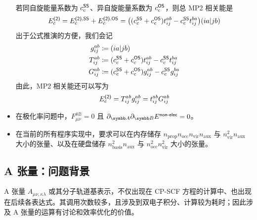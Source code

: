 \begin{itemize}[nosep]
\begin{align}
        \end{align}
        若同自旋能量系数为 $c_\mathrm{c}^{\textsf{SS}}$、异自旋能量系数为 $c_\mathrm{c}^{\textsf{OS}}$，则总 MP2 相关能是
        \begin{equation}
          E_\mathrm{c}^{\textsf{(2)}} = E_\mathrm{c}^{\textsf{(2)}, \textsf{SS}} + E_\mathrm{c}^{\textsf{(2)}, \textsf{OS}} = \big( (c_\mathrm{c}^{\textsf{SS}} + c_\mathrm{c}^{\textsf{OS}}) t_{ij}^{ab} - c_\mathrm{c}^{\textsf{SS}} t_{ij}^{ba} \big) (ia|jb)
        \end{equation}
        出于公式推演的方便，我们会记
        \begin{align}
            \label{eq.3.def.g-ijab}
            g_{ij}^{ab} &\coloneq (ia|jb) \\
            \label{eq.3.def.T-ijab}
            T_{ij}^{ab} &\coloneq (c_\mathrm{c}^{\textsf{SS}} + c_\mathrm{c}^{\textsf{OS}}) t_{ij}^{ab} - c_\mathrm{c}^{\textsf{SS}} t_{ij}^{ba} \\
            \label{eq.3.def.G-ijab}
            G_{ij}^{ab} &\coloneq (c_\mathrm{c}^{\textsf{SS}} + c_\mathrm{c}^{\textsf{OS}}) g_{ij}^{ab} - c_\mathrm{c}^{\textsf{SS}} g_{ij}^{ba}
        \end{align}
        由此，MP2 相关能还可以写为
        \begin{align}
            \label{eq.3.emp2-by-T}
            E_\mathrm{c}^{\textsf{(2)}} = T_{ij}^{ab} g_{ij}^{ab} = t_{ij}^{ab} G_{ij}^{ab}
        \end{align}
    \item 在极化率问题中，$F_{\mu \nu}^\mathbb{AB} = 0$ 且 $\partial_\mathbb{A} \partial_\mathbb{B} E^\textmt{non-elec} = 0$。
    \item 在当前的所有程序实现中，要求可以在内存储存 $n_\mathrm{prop} n_\mathrm{occ} n_\mathrm{vir} n_\mathrm{aux}$ 与 $n_\mathrm{vir}^2 n_\mathrm{aux}$ 大小的张量、以及在硬盘储存 $n_\mathrm{basis}^2 n_\mathrm{aux}$ 与 $n_\mathrm{occ}^2 n_\mathrm{vir}^2$ 大小的张量。%
\end{itemize}

\subsection{A 张量：问题背景}

A 张量 $A_{\mu \nu, \kappa \lambda}$ 或其分子轨道基表示，不仅出现在 CP-SCF 方程的计算中、也出现在后续各表达式。其调用次数较多，且涉及到双电子积分、计算较为耗时；因此涉及 A 张量的运算有讨论和效率优化的价值。

